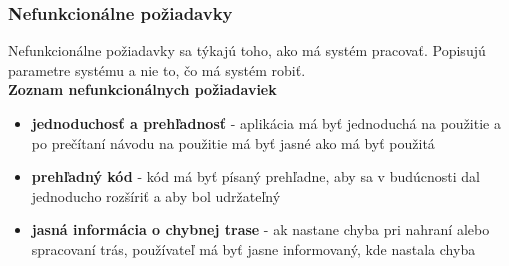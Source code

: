 \subsubsection{Nefunkcionálne požiadavky}
Nefunkcionálne požiadavky sa týkajú toho, ako má systém pracovať. Popisujú parametre systému a nie to, čo má systém robiť.\\
\textbf{Zoznam nefunkcionálnych požiadaviek}
\begin{itemize}
    \item \textbf{jednoduchosť a prehľadnosť} - aplikácia má byť jednoduchá na použitie a po prečítaní návodu na použitie má byť jasné ako má byť použitá
    \item \textbf{prehľadný kód} - kód má byť písaný prehľadne, aby sa v budúcnosti dal jednoducho rozšíriť a aby bol udržateľný
    \item \textbf{jasná informácia o chybnej trase} - ak nastane chyba pri nahraní alebo spracovaní trás, používateľ má byť jasne informovaný, kde nastala chyba
\end{itemize}

